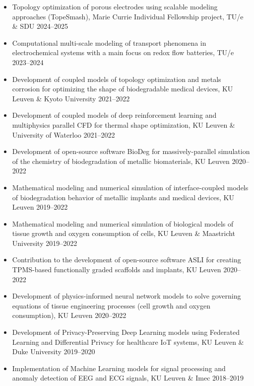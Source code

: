 \documentclass{cv}
\begin{document}
\begin{itemize} [itemsep=-0.2ex]
\item
Topology optimization of porous electrodes using scalable modeling approaches (TopeSmash), Marie Currie Individual Fellowship project, {TU/e \& SDU} \hfill 2024--2025
\item
Computational multi-scale modeling of transport phenomena in electrochemical systems with a main focus on redox flow batteries, {TU/e} \hfill 2023--2024
\item
Development of coupled models of topology optimization and metals corrosion for optimizing the shape of biodegradable medical devices, {KU Leuven \& Kyoto University} \hfill 2021--2022
\item
Development of coupled models of deep reinforcement learning and multiphysics parallel CFD for thermal shape optimization, KU Leuven \& University of Waterloo \hfill 2021--2022
\item
Development of open-source software BioDeg for massively-parallel simulation of the chemistry of biodegradation of metallic biomaterials, {KU Leuven} \hfill 2020--2022
\item
Mathematical modeling and numerical simulation of interface-coupled models of biodegradation behavior of metallic implants and medical devices, {KU Leuven} \hfill 2019--2022
\item
Mathematical modeling and numerical simulation of biological models of tissue growth and oxygen consumption of cells, {KU Leuven} \& Maastricht University \hfill 2019--2022
\item 
Contribution to the development of open-source software ASLI for creating TPMS-based functionally graded scaffolds and implants, KU Leuven \hfill 2020--2022
\item
Development of physics-informed neural network models to solve governing equations of tissue engineering processes (cell growth and oxygen consumption), {KU Leuven} \hfill 2020--2022
\item
Development of Privacy-Preserving Deep Learning models using Federated Learning and Differential Privacy for healthcare IoT systems, {KU Leuven \& Duke University} \hfill 2019--2020
\item
Implementation of Machine Learning models for signal processing and anomaly detection of EEG and ECG signals, {KU Leuven \& Imec} \hfill 2018--2019
\end{itemize}


\end{document}
